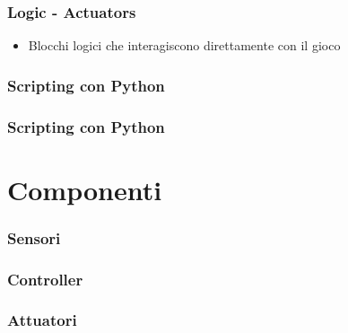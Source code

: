 \documentclass{beamer}
\begin{document}
		
		\begin{frame}
			\frametitle{Logic - Actuators} %
			\begin{itemize}
				\item Blocchi logici che interagiscono direttamente con il gioco
			\end{itemize}
		\end{frame}			
		
		\begin{frame}
			\frametitle{Scripting con Python}
		\end{frame}	
		
		\begin{frame}
			\frametitle{Scripting con Python}
		\end{frame}	
	
	\section{Componenti}
		\begin{frame}
			\frametitle{Sensori}
		\end{frame}
		\begin{frame}
			\frametitle{Controller}
		\end{frame}
		\begin{frame}
			\frametitle{Attuatori}
		\end{frame}
\end{document}
